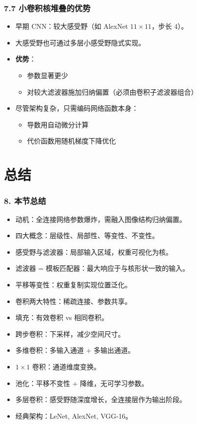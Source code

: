 \documentclass[t,aspectratio=169]{beamer} %
\begin{document}
\begin{frame}
    \frametitle{7.7 小卷积核堆叠的优势}
    \begin{itemize}
        \item 早期 CNN：较大感受野（如 AlexNet $11 \times 11$，步长 4）。
        \item 大感受野也可通过\alert{多层小感受野}隐式实现。
        \item \textbf{优势}：
        \begin{itemize}
            \item 参数显著更少
            \item 对较大滤波器施加归纳偏置（必须由卷积子滤波器组合）
        \end{itemize}
        \item 尽管架构复杂，只需编码\alert{网络函数本身}：
        \begin{itemize}
            \item 导数用\alert{自动微分}计算
            \item 代价函数用\alert{随机梯度下降}优化
        \end{itemize}
    \end{itemize}
\end{frame}

\section{总结}

\begin{frame}
    \frametitle{8. 本节总结}
    \begin{itemize}
        \item \alert{动机}：全连接网络参数爆炸，需融入图像结构归纳偏置。
        \item \alert{四大概念}：层级性、局部性、等变性、不变性。
        \item \alert{感受野与滤波器}：局部输入区域，权重可视化为核。
        \item \alert{滤波器 = 模板匹配器}：最大响应于与核形状一致的输入。
        \item \alert{平移等变性}：权重复制实现位置泛化。
        \item \alert{卷积两大特性}：稀疏连接、参数共享。
        \item \alert{填充}：有效卷积 vs 相同卷积。
        \item \alert{跨步卷积}：下采样，减少空间尺寸。
        \item \alert{多维卷积}：多输入通道 + 多输出通道。
        \item \alert{$1 \times 1$ 卷积}：通道维度变换。
        \item \alert{池化}：平移不变性 + 降维，无可学习参数。
        \item \alert{多层卷积}：感受野随深度增长，全连接层作为输出阶段。
        \item \alert{经典架构}：LeNet, AlexNet, VGG-16。
    \end{itemize}
\end{frame}
\end{document}
